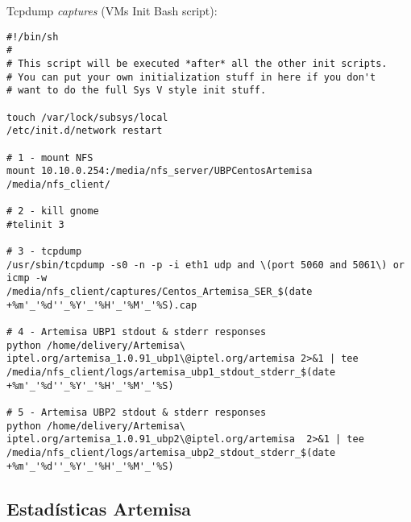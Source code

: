 \documentclass[a4paper,12pt]{report}
\newenvironment{myscriptlisting}
{\begin{list}{}{\setlength{\leftmargin}{1em}}\item\scriptsize\bfseries}
{\end{list}}
\begin{document}
Tcpdump \emph{captures} (VMs Init Bash script):
\begin{myscriptlisting}   
  \begin{verbatim}
#!/bin/sh
#
# This script will be executed *after* all the other init scripts.
# You can put your own initialization stuff in here if you don't
# want to do the full Sys V style init stuff.

touch /var/lock/subsys/local
/etc/init.d/network restart

# 1 - mount NFS
mount 10.10.0.254:/media/nfs_server/UBPCentosArtemisa /media/nfs_client/

# 2 - kill gnome
#telinit 3

# 3 - tcpdump 
/usr/sbin/tcpdump -s0 -n -p -i eth1 udp and \(port 5060 and 5061\) or icmp -w
/media/nfs_client/captures/Centos_Artemisa_SER_$(date
+%m'_'%d''_%Y'_'%H'_'%M'_'%S).cap

# 4 - Artemisa UBP1 stdout & stderr responses
python /home/delivery/Artemisa\
iptel.org/artemisa_1.0.91_ubp1\@iptel.org/artemisa 2>&1 | tee
/media/nfs_client/logs/artemisa_ubp1_stdout_stderr_$(date
+%m'_'%d''_%Y'_'%H'_'%M'_'%S)

# 5 - Artemisa UBP2 stdout & stderr responses
python /home/delivery/Artemisa\
iptel.org/artemisa_1.0.91_ubp2\@iptel.org/artemisa  2>&1 | tee
/media/nfs_client/logs/artemisa_ubp2_stdout_stderr_$(date
+%m'_'%d''_%Y'_'%H'_'%M'_'%S)
  \end{verbatim}
\end{myscriptlisting}

\subsection{Estadísticas Artemisa}
\end{document}
